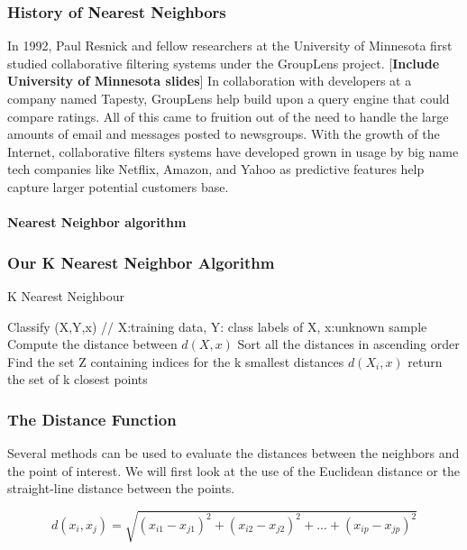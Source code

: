 \documentclass{report}
\begin{document}
\subsubsection*{History of Nearest Neighbors}

In 1992, Paul Resnick and fellow researchers at the University of Minnesota first studied collaborative filtering systems under the GroupLens project. [\textbf{Include University of Minnesota slides}] In collaboration with developers at a company named Tapesty, GroupLens help build upon a query engine that could compare ratings. All of this came to fruition out of the need to handle the large amounts of email and messages posted to newsgroups. With the growth of the Internet, collaborative filters systems have developed grown in usage by big name tech companies like Netflix, Amazon, and Yahoo as predictive features help capture larger potential customers base.

\paragraph{Nearest Neighbor algorithm}


\subsubsection*{ Our K Nearest Neighbor Algorithm}
\begin{algorithm}
  \caption{K Nearest Neighbour}
  \begin{algorithmic}
  	\State Classify (X,Y,x) // X:training data, Y: class labels of X, x:unknown sample
	\State Compute the distance between $d(X, x)$
	\State Sort all the distances in ascending order
	\EndFor
	\State Find the set Z containing indices for the k smallest distances $d(X_{i},x)$
	\State return the set of k closest points 
  \end{algorithmic}
\end{algorithm}


\subsubsection*{The Distance Function}

Several methods can be used to evaluate the distances between the neighbors and the point of interest.
We will first look at the use of the Euclidean distance or the straight-line distance between the points.

\begin{equation}
d(x_{i},x_{j}) = \sqrt{(x_{i1} - x_{j1})^2 + (x_{i2} - x_{j2})^2 + ... + (x_{ip} - x_{jp})^2}
\end{equation}
\end{document}
